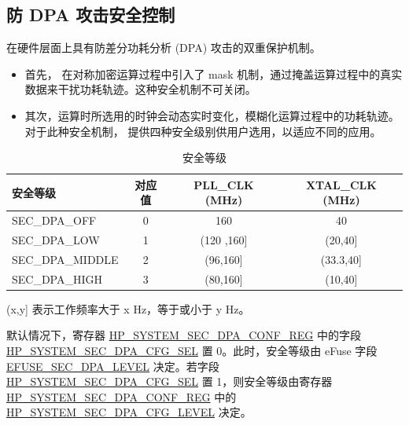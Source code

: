\documentclass[main\_\_CN.tex]{subfiles}
\begin{document}
\subsection{防 DPA 攻击安全控制}
\label{sec:sysreg-anti-dpa-attack-security-control}

\chipname{} 在硬件层面上具有防差分功耗分析 (DPA) 攻击的双重保护机制。

\begin{itemize}
    \item 首先，\chipname{} 在对称加密运算过程中引入了 mask 机制，通过掩盖运算过程中的真实数据来干扰功耗轨迹。这种安全机制不可关闭。
    \item 其次，运算时所选用的时钟会动态实时变化，模糊化运算过程中的功耗轨迹。对于此种安全机制，\chipname{} 提供四种安全级别供用户选用，以适应不同的应用。
\end{itemize}


\begin{table}[H]
    \centering
    \caption{安全等级}
    \label{tab:sysreg-security-level}
    \begin{threeparttable}
    \begin{tabular}[c]{| l | c | c | c |}  
    \hline
    \rowcolor{lightgray}
        \textbf{安全等级} & \textbf{对应值} & \textbf{PLL\_CLK (MHz)} & \textbf{XTAL\_CLK (MHz)} \\ \hline
        SEC\_DPA\_OFF       & 0    & 160           & 40          \\\hline
        SEC\_DPA\_LOW       & 1    & (120 ,160]\tnote{A}   & (20,40]\tnote{A}   \\\hline
        SEC\_DPA\_MIDDLE    & 2    & (96,160]\tnote{A}    & (33.3,40]\tnote{A} \\\hline
        SEC\_DPA\_HIGH      & 3    & (80,160]\tnote{A}    & (10,40]\tnote{A}   \\\hline
    \end{tabular}
    \begin{tablenotes}
        \item[A] (x,y] 表示工作频率大于 x Hz，等于或小于 y Hz。
    \end{tablenotes}
    \end{threeparttable}
\end{table}

默认情况下，寄存器 \hyperref[regdesc:HPSYSTEMSECDPACONFREG]{HP\_SYSTEM\_SEC\_DPA\_CONF\_REG} 中的字段 \hyperref[fielddesc:HPSYSTEMSECDPALEVEL]{HP\_SYSTEM\_SEC\_DPA\_CFG\_SEL} 置 0。此时，安全等级由 eFuse 字段 \hyperref[fielddesc:EFUSESECDPALEVEL]{EFUSE\_SEC\_DPA\_LEVEL} 决定。若字段 \hyperref[fielddesc:HPSYSTEMSECDPALEVEL]{HP\_SYSTEM\_SEC\_DPA\_CFG\_SEL} 置 1，则安全等级由寄存器 \hyperref[regdesc:HPSYSTEMSECDPACONFREG]{HP\_SYSTEM\_SEC\_DPA\_CONF\_REG} 中的 \hyperref[fielddesc:HPSYSTEMSECDPALEVEL]{HP\_SYSTEM\_SEC\_DPA\_CFG\_LEVEL} 决定。
\end{document}
